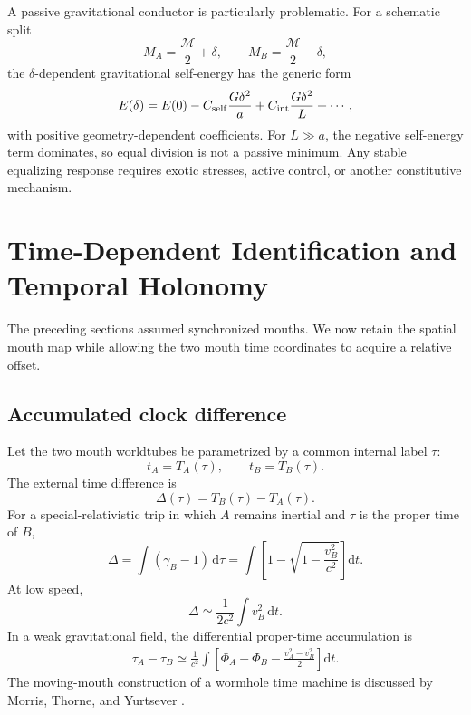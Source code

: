 \documentclass[journal,a4paper]{IEEEtran}
\begin{document}
A passive gravitational conductor is particularly problematic. For a schematic split
\begin{equation}
    M_A=\frac{\mathcal M}{2}+\delta,
    \qquad
    M_B=\frac{\mathcal M}{2}-\delta,
\end{equation}
the \(\delta\)-dependent gravitational self-energy has the generic form
\begin{equation}
    E(\delta)=E(0)
    -C_{\rm self}\frac{G\delta^2}{a}
    +C_{\rm int}\frac{G\delta^2}{L}+\cdots,
    \label{eq:schematic_grav_energy}
\end{equation}
with positive geometry-dependent coefficients. For \(L\gg a\), the negative self-energy term dominates, so equal division is not a passive minimum. Any stable equalizing response requires exotic stresses, active control, or another constitutive mechanism.

\section{Time-Dependent Identification and Temporal Holonomy}
\label{sec:time_holonomy}

The preceding sections assumed synchronized mouths. We now retain the spatial mouth map while allowing the two mouth time coordinates to acquire a relative offset.

\subsection{Accumulated clock difference}

Let the two mouth worldtubes be parametrized by a common internal label \(\tau\):
\begin{equation}
    t_A=T_A(\tau),
    \qquad
    t_B=T_B(\tau).
\end{equation}
The external time difference is
\begin{equation}
    \Delta(\tau)=T_B(\tau)-T_A(\tau).
\end{equation}
For a special-relativistic trip in which \(A\) remains inertial and \(\tau\) is the proper time of \(B\),
\begin{equation}
    \Delta=\int(\gamma_B-1)\,\mathrm{d}\tau
    =\int\left[1-\sqrt{1-\frac{v_B^2}{c^2}}\right]\mathrm{d}t.
\end{equation}
At low speed,
\begin{equation}
    \Delta\simeq\frac{1}{2c^2}\int v_B^2\,\mathrm{d}t.
\end{equation}
In a weak gravitational field, the differential proper-time accumulation is
\begin{equation}
\begin{split}
\tau_A-\tau_B\simeq\frac{1}{c^2}\int
\left[
\Phi_A-\Phi_B
-\frac{v_A^2-v_B^2}{2}
\right]\mathrm{d}t.
\end{split}
\end{equation}
The moving-mouth construction of a wormhole time machine is discussed by Morris, Thorne, and Yurtsever \cite{MorrisThorneYurtsever1988}.
\end{document}
